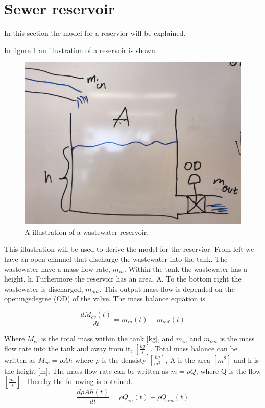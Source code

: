 \section{Sewer reservoir}\label{se:sewer_reservoir}
In this section the model for a reservior will be explained. 

In figure \ref{fig:tank_model} an illustration of a reservoir is shown.
\begin{figure}[H]
\centering
\includegraphics[width=.6\textwidth]{report/modeling/pictures/tank_model.jpg}
\caption{A illustration of a wastewater reservoir.}
\label{fig:tank_model}
\end{figure} 

This illustration will be used to derive the model for the reservior. From left we have an open channel that discharge the wastewater into the tank. The wastewater have a mass flow rate, $m_{in}$. Within the tank the wastewater has a height, h. Furhermore the reservoir has an area, A. To the bottom right the wastewater is discharged, $m_{out}$. This output mass flow is depended on the openingsdegree (OD) of the valve. The mass balance equation is.


\begin{equation}
	 	\frac{dM_{cv}(t)}{dt}=\dot{m}_{in}(t)-\dot{m}_{out}(t)
\end{equation} 

Where $M_{cv}$ is the total mass within the tank [kg], and $m_{in}$ and $m_{out}$ is the mass flow rate into the tank and away from it, $\left[\frac{kg}{s}\right]$. Total mass balance can be written as $M_{cv} = \rho Ah$ where $\rho$ is the densisty $\left[\frac{kg}{m^3}\right]$, A is the area $\left[m^2\right]$ and h is the height [m]. The mass flow rate can be written as $m = \rho Q$, where Q is the flow $\left[\frac{m^3}{s}\right]$. Thereby the following is obtained.
\begin{equation}
		\frac{d\rho Ah(t)}{dt}=\rho Q_{in}(t)-\rho Q_{out}(t)
\end{equation}

